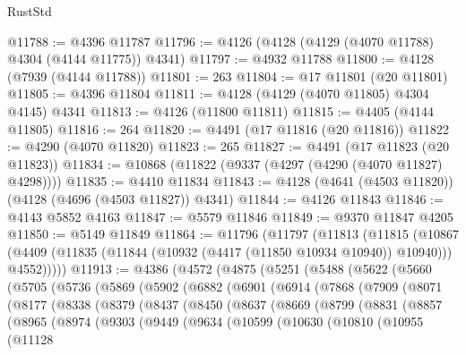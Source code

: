 \begin{lexlean}{RustStd}
\begin{coremodule}
@11788 := @4396 @11787
@11796 := @4126 (@4128 (@4129 (@4070 @11788) @4304 (@4144 @11775)) @4341)
@11797 := @4932 @11788
@11800 := @4128 (@7939 (@4144 @11788))
@11801 := 263
@11804 := @17 @11801 (@20 @11801)
@11805 := @4396 @11804
@11811 := @4128 (@4129 (@4070 @11805) @4304 @4145) @4341
@11813 := @4126 (@11800 @11811)
@11815 := @4405 (@4144 @11805)
@11816 := 264
@11820 := @4491 (@17 @11816 (@20 @11816))
@11822 := @4290 (@4070 @11820)
@11823 := 265
@11827 := @4491 (@17 @11823 (@20 @11823))
@11834 := @10868 (@11822 (@9337 (@4297 (@4290 (@4070 @11827) @4298))))
@11835 := @4410 @11834
@11843 := @4128 (@4641 (@4503 @11820)) (@4128 (@4696 (@4503 @11827)) @4341)
@11844 := @4126 @11843
@11846 := @4143 @5852 @4163
@11847 := @5579 @11846
@11849 := @9370 @11847 @4205
@11850 := @5149 @11849
@11864 := @11796
    (@11797
      (@11813
        (@11815
          (@10867 (@4409 (@11835 (@11844 (@10932 (@4417 (@11850 @10934 @10940)) @10940))) @4552)))))
@11913 := @4386
    (@4572
      (@4875
        (@5251
          (@5488
            (@5622
              (@5660
                (@5705
                  (@5736
                    (@5869
                      (@5902
                        (@6882
                          (@6901
                            (@6914
                              (@7868
                                (@7909
                                  (@8071
                                    (@8177
                                      (@8338
                                        (@8379
                                          (@8437
                                            (@8450
                                              (@8637
                                                (@8669
                                                  (@8799
                                                    (@8831
                                                      (@8857
                                                        (@8965
                                                          (@8974
                                                            (@9303
                                                              (@9449
                                                                (@9634
                                                                  (@10599
                                                                    (@10630
                                                                      (@10810
                                                                        (@10955
                                                                          (@11128

\end{coremodule}
\end{lexlean}

